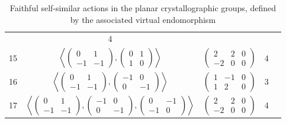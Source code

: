 \documentclass[a4paper,12pt]{amsart}
\begin{document}
\begin{table}[h]
\begin{tabular}{|c|c|c|c|c|}
		  & 4 &\\
		  
		   15 & $\left\langle 
		  \begin{pmatrix}
		  	0 & 1 \\ 
		  	-1 & -1 
		  \end{pmatrix}, 			
		  \begin{pmatrix}
		  	0 & 1 \\ 
		  	1 & 0
		  \end{pmatrix}
		  \right\rangle$
		  
		  & $\left(\begin{array}{cc|c}  
		  	2 & 2  & 0\\ 
		  	-2 & 0   & 0
		  \end{array}\right)$  
		  
		  & 4 &\\
		  
		   16 & $\left\langle 
		  \begin{pmatrix}
		  	0 & 1 \\ 
		  	-1 & -1 
		  \end{pmatrix}, 			
		  \begin{pmatrix}
		  	-1 & 0 \\ 
		  	0 & -1
		  \end{pmatrix}
		  \right\rangle$
		  
		  & $\left(\begin{array}{cc|c}  
		  	1 & -1  & 0\\ 
		  	1 & 2   & 0
		  \end{array}\right)$  
		  
		  & 3 &\\
		  
		  17 & $\left\langle 
		  \begin{pmatrix}
		  	0 & 1 \\ 
		  	-1 & -1 
		  \end{pmatrix}, 			
		  \begin{pmatrix}
		  	-1 & 0 \\ 
		  	0 & -1
		  \end{pmatrix},
		  \begin{pmatrix}
		  	0 & -1 \\ 
		  	-1 & 0
		  \end{pmatrix}
		  \right\rangle$
		  
		  & $\left(\begin{array}{cc|c}  
		  	2 & 2  & 0\\ 
		  	-2 & 0   & 0
		  \end{array}\right)$  
		  
		  & 4 &\\
		  
		  \hline
		\end{tabular}
	
	\caption{Faithful self-similar actions in the planar crystallographic groups, defined by the associated virtual endomorphism}
	
	\label{tab:self-similar}
	\end{table}
	
\end{document}
